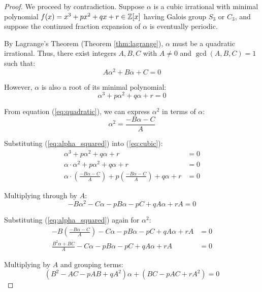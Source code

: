 \begin{proof}
We proceed by contradiction. Suppose $\alpha$ is a cubic irrational with minimal polynomial $f(x) = x^3 + px^2 + qx + r \in \mathbb{Z}[x]$ having Galois group $S_3$ or $C_3$, and suppose the continued fraction expansion of $\alpha$ is eventually periodic.

By Lagrange's Theorem (Theorem \ref{thm:lagrange}), $\alpha$ must be a quadratic irrational. Thus, there exist integers $A, B, C$ with $A \neq 0$ and $\gcd(A, B, C) = 1$ such that:
\begin{equation}\label{eq:quadratic}
A\alpha^2 + B\alpha + C = 0
\end{equation}

However, $\alpha$ is also a root of its minimal polynomial:
\begin{equation}\label{eq:cubic}
\alpha^3 + p\alpha^2 + q\alpha + r = 0
\end{equation}

From equation (\ref{eq:quadratic}), we can express $\alpha^2$ in terms of $\alpha$:
\begin{equation}\label{eq:alpha_squared}
\alpha^2 = \frac{-B\alpha - C}{A}
\end{equation}

Substituting (\ref{eq:alpha_squared}) into (\ref{eq:cubic}):
\begin{align*}
\alpha^3 + p\alpha^2 + q\alpha + r &= 0\\
\alpha \cdot \alpha^2 + p\alpha^2 + q\alpha + r &= 0\\
\alpha \cdot \left(\frac{-B\alpha - C}{A}\right) + p\left(\frac{-B\alpha - C}{A}\right) + q\alpha + r &= 0
\end{align*}

Multiplying through by $A$:
\begin{equation}
-B\alpha^2 - C\alpha - pB\alpha - pC + qA\alpha + rA = 0
\end{equation}

Substituting (\ref{eq:alpha_squared}) again for $\alpha^2$:
\begin{align*}
-B\left(\frac{-B\alpha - C}{A}\right) - C\alpha - pB\alpha - pC + qA\alpha + rA &= 0\\
\frac{B^2\alpha + BC}{A} - C\alpha - pB\alpha - pC + qA\alpha + rA &= 0
\end{align*}

Multiplying by $A$ and grouping terms:
\begin{equation}\label{eq:combined}
(B^2 - AC - pAB + qA^2)\alpha + (BC - pAC + rA^2) = 0
\end{equation}


\end{proof}
